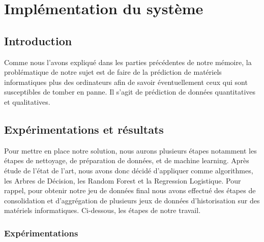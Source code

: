 \chapter{Implémentation du système}
\minitoc
\newpage

\section{Introduction}

Comme nous l'avons expliqué dans les parties précédentes de notre mémoire, la problématique de notre sujet est de faire de la prédiction  de matériels informatiques plus des ordinateurs afin de savoir éventuellement ceux qui sont susceptibles de tomber en panne. Il s'agit de prédiction de données quantitatives et qualitatives.

\section{Expérimentations et résultats}
Pour mettre en place notre solution, nous aurons plusieurs étapes notamment les étapes de nettoyage, de préparation  de données, et de machine learning. Après étude de l'état de l'art, nous avons donc décidé d'appliquer comme algorithmes, les Arbres de Décision, les Random Forest et la Regression Logistique.  Pour rappel, pour obtenir notre jeu de données final nous avons effectué des étapes de consolidation et d'aggrégation de plusieurs jeux de données d'historisation sur des matériels informatiques. Ci-dessous, les étapes de notre travail.

\subsection{Expérimentations}

